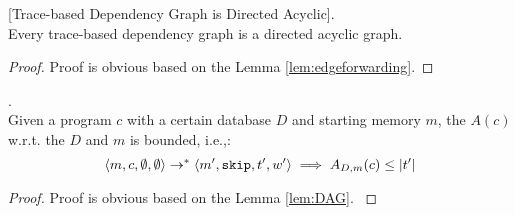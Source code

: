 \documentclass[a4paper,11pt]{article}
\begin{document}
%
\begin{lem}
\label{lem:DAG}
[Trace-based Dependency Graph is Directed Acyclic].
\\
%
{
Every trace-based dependency graph is a directed acyclic graph.
}
\end{lem}
%
{
\begin{proof}
Proof is obvious based on the Lemma \ref{lem:edgeforwarding}.
\end{proof}
}
%
\begin{lem}
.
\\
{
Given a program $c$ with a certain database $D$ and starting memory $m$, the $A(c)$ w.r.t. the $D$ and $m$ is bounded, i.e.,:
%
\[
\langle m, c, \emptyset, \emptyset \rangle 
\rightarrow^{*} 
\langle m', \mathtt{skip}, t', w' \rangle 
\implies
A_{D, m}(c) \leq |t'|
\]
}
\end{lem}
%
\begin{proof}
{
Proof is obvious based on the Lemma \ref{lem:DAG}.
}
\end{proof}
%
%
\clearpage
\end{document}
